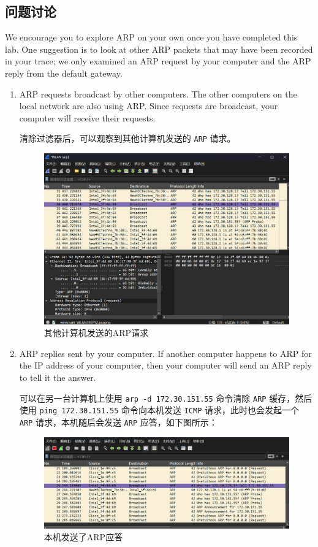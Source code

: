 \documentclass{article}
\begin{document}
	\subsection{问题讨论}
	
	We encourage you to explore ARP on your own once you have completed this lab. One suggestion is to look at other ARP packets that may have been recorded in your trace; we only examined an ARP request by your computer and the ARP reply from the default gateway. 
	
	\begin{enumerate}
		
		\item ARP requests broadcast by other computers. The other computers on the local network are also using ARP. Since requests are broadcast, your computer will receive their requests. 
		
		清除过滤器后，可以观察到其他计算机发送的 \texttt{ARP} 请求。
		
		\begin{figure}[H]
			\centering
			\includegraphics[width=11cm]{images/12.其他计算机发送的ARP请求.png}
			\caption{其他计算机发送的ARP请求}
		\end{figure}
		
		\item ARP replies sent by your computer. If another computer happens to ARP for the IP address of your computer, then your computer will send an ARP reply to tell it the answer. 
		
		可以在另一台计算机上使用 \texttt{arp -d 172.30.151.55} 命令清除 \texttt{ARP} 缓存，然后使用 \texttt{ping 172.30.151.55} 命令向本机发送 \texttt{ICMP} 请求，此时也会发起一个 \texttt{ARP} 请求，本机随后会发送 \texttt{ARP} 应答，如下图所示：
		
		\begin{figure}[H]
			\centering
			\includegraphics[width=11cm]{images/13.本机发送了ARP应答.png}
			\caption{本机发送了ARP应答}
		\end{figure}
		

\end{enumerate}
\end{document}
